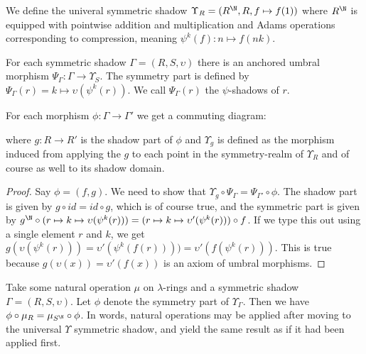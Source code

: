 \begin{definition}
  We define the univeral symmetric shadow $\Upsilon_R = (R^{\N}, R, f \mapsto f(1))$ where $R^{\N}$ is equipped with pointwise addition and multiplication and Adams operations corresponding to compression, meaning $\psi^k(f) : n \mapsto f(nk)$.
\end{definition}

\begin{propdef}
  For each symmetric shadow $\Gamma = (R, S, \upsilon)$ there is an anchored umbral morphism $\Psi_{\Gamma} : \Gamma \to \Upsilon_S$. The symmetry part is defined by $\Psi_{\Gamma}(r) = k \mapsto \upsilon(\psi^k(r))$. We call $\Psi_{\Gamma}(r)$ the $\psi$-shadows of $r$.
\end{propdef}

\begin{propdef} \label{propdef:upsilonUniversalDiagram}
  For each morphism $\phi : \Gamma \to \Gamma'$ we get a commuting diagram:
  \begin{center}
  \end{center}
  where $g : R \to R'$ is the shadow part of $\phi$ and $\Upsilon_{g}$ is defined as the morphism induced from applying the $g$ to each point in the symmetry-realm of $\Upsilon_R$ and of course as well to its shadow domain.
\end{propdef}

\begin{proof}
  Say $\phi = (f, g)$. We need to show that $\Upsilon_{g} \circ \Psi_\Gamma = \Psi_{\Gamma'} \circ \phi$. The shadow part is given by $g \circ id = id \circ g$, which is of course true, and the symmetric part is given by $g^{\N} \circ (r \mapsto k \mapsto \upsilon(\psi^k(r))) = (r \mapsto k \mapsto \upsilon'(\psi^k(r))) \circ f$. If we type this out using a single element $r$ and $k$, we get $g(\upsilon(\psi^k(r))) = \upsilon'(\psi^k(f(r)))) = \upsilon'(f(\psi^k(r)))$. This is true because $g(\upsilon(x)) = \upsilon'(f(x))$ is an axiom of umbral morphisms. \qedhere
\end{proof}

\begin{proposition} \label{prop:naturalCommutativity}
  Take some natural operation $\mu$ on $\lambda$-rings and a symmetric shadow $\Gamma = (R, S, \upsilon)$. Let $\phi$ denote the symmetry part of $\Upsilon_\Gamma$. Then we have $\phi \circ \mu_R = \mu_{S^{\N}} \circ \phi$. In words, natural operations may be applied after moving to the universal $\Upsilon$ symmetric shadow, and yield the same result as if it had been applied first.
\end{proposition}

